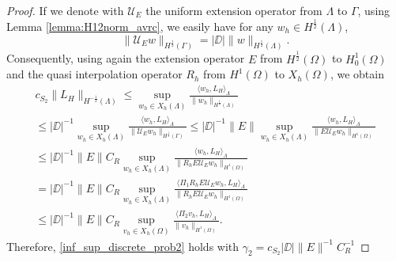 \begin{proof}
If we denote with $\mathcal{U}_E$ the uniform extension operator from $\Lambda$ to $\Gamma$, using Lemma \ref{lemma:H12norm_avrc}, we easily have for any $w_h \in H^{\frac 12}(\Lambda)$,
\begin{equation*}
\|\mathcal{U}_E w\|_{H^{\frac 12}(\Gamma)}=|\DD| \|w\|_{H^{\frac 12}(\Lambda)}.
\end{equation*}
Consequently, using again the extension operator $E$ from $H^{\frac 12}(\Omega)$ to $H^1_0(\Omega)$ and the quasi interpolation operator $R_h$ from $H^1(\Omega)$ to $X_h(\Omega)$, we obtain
\begin{multline}
c_{S_2} \|L_H\|_{H^{-\frac 12}(\Lambda)} \leq 
\sup_{w_h \in X_h(\Lambda)} \frac{ \langle w_h, L_H \rangle_{\Lambda} } {\|w_h\|_{H^{\frac 12}(\Lambda)}} 
\\
\leq |\DD|^{-1} \sup_{w_h \in X_h(\Lambda)} \frac{ \langle w_h, L_H \rangle _{\Lambda}} {\|\mathcal{U}_E w_h\|_{H^{\frac 12}(\Gamma)}} 
\leq |\DD|^{-1}\|E\| \sup_{w_h \in X_h(\Lambda)} \frac{ \langle w_h, L_H \rangle _{\Lambda} } {\|E \mathcal{U}_E w_h\|_{H^1(\Omega)}} 
\\
\leq |\DD|^{-1}\|E\| C_R \sup_{w_h \in X_h(\Lambda)} \frac{ \langle w_h, L_H \rangle _{\Lambda} } {\|R_h E \mathcal{U}_E w_h\|_{H^1(\Omega)}}
\\ 
=  |\DD|^{-1}\|E\| C_R \sup_{w_h \in X_h(\Lambda)} \frac{ \langle \Pi _1  R_h E \mathcal{U}_E w_h, L_H \rangle _{\Lambda}} {\|R_h E \mathcal{U}_E w_h\|_{H^1(\Omega)}}
\\
\leq |\DD|^{-1}\|E\| C_R \sup_{v_h \in X_h(\Omega)} \frac{ \langle \Pi _2  v_h, L_H \rangle _{\Lambda}} {\|v_h\|_{H^1(\Omega)}}. 
\end{multline}
Therefore, \eqref{inf_sup_discrete_prob2} holds with $\gamma_2=  c_{S_2} |\DD| \|E\|^{-1} C_R^{-1}$
\end{proof}

